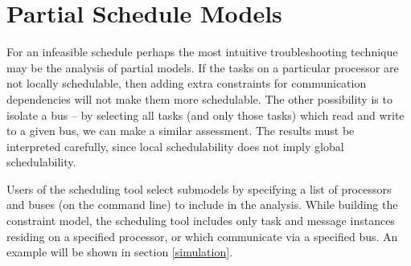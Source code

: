 \section{Partial Schedule Models}
\label{troubleshooting}

For an infeasible schedule perhaps the most intuitive troubleshooting technique may be the analysis of partial models.  If the tasks on a particular processor are not locally schedulable, then adding extra constraints for communication dependencies will not make them more schedulable.  The other possibility is to isolate a bus -- by selecting all tasks (and only those tasks) which read and write to a given bus, we can make a similar assessment.  The results must be interpreted carefully, since local schedulability does not imply global schedulability.

Users of the scheduling tool select submodels by specifying a list of processors and buses (on the command line) to include in the analysis.  While building the constraint model, the scheduling tool includes only task and message instances residing on a specified processor, or which communicate via a specified bus.  An example will be shown in section \ref{simulation}.